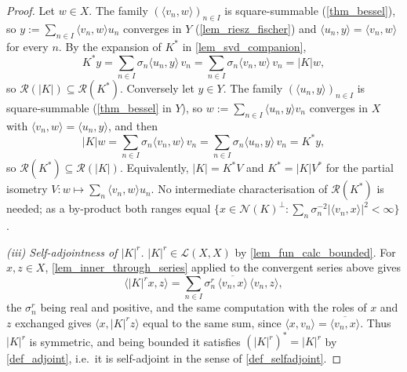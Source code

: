 \documentclass[a4paper]{report}
\theoremstyle{plain}
\theoremstyle{definition}
\theoremstyle{remark}
\begin{document}
\begin{proof}
  Let $w \in X$.  The family $(\langle v_n,w\rangle)_{n\in I}$ is square-summable
  (\cref{thm_bessel}), so $y := \sum_{n\in I}\langle v_n,w\rangle u_n$ converges in $Y$
  (\cref{lem_riesz_fischer}) and $\langle u_n,y\rangle = \langle v_n,w\rangle$ for every
  $n$.  By the expansion of $K^*$ in \cref{lem_svd_companion},
  \[
    K^*y = \sum_{n\in I}\sigma_n\langle u_n,y\rangle\,v_n
      = \sum_{n\in I}\sigma_n\langle v_n,w\rangle\,v_n = |K|w ,
  \]
  so $\mathcal{R}(|K|) \subseteq \mathcal{R}(K^*)$.  Conversely let $y \in Y$.  The family
  $(\langle u_n,y\rangle)_{n\in I}$ is square-summable (\cref{thm_bessel} in $Y$), so
  $w := \sum_{n\in I}\langle u_n,y\rangle v_n$ converges in $X$ with
  $\langle v_n,w\rangle = \langle u_n,y\rangle$, and then
  \[
    |K|w = \sum_{n\in I}\sigma_n\langle v_n,w\rangle\,v_n
      = \sum_{n\in I}\sigma_n\langle u_n,y\rangle\,v_n = K^*y ,
  \]
  so $\mathcal{R}(K^*) \subseteq \mathcal{R}(|K|)$.  Equivalently, $|K| = K^*V$ and
  $K^* = |K|V^*$ for the partial isometry $V \colon w \mapsto \sum_n\langle
  v_n,w\rangle u_n$.  No intermediate characterisation of $\mathcal{R}(K^*)$ is needed;
  as a by-product both ranges equal
  $\{x \in \mathcal{N}(K)^\perp : \sum_n\sigma_n^{-2}|\langle v_n,x\rangle|^2 < \infty\}$.

  \emph{(iii) Self-adjointness of $|K|^r$.}  $|K|^r \in \mathcal{L}(X,X)$ by
  \cref{lem_fun_calc_bounded}.  For $x,z \in X$, \cref{lem_inner_through_series} applied to
  the convergent series above gives
  \[
    \langle |K|^rx, z\rangle
      = \sum_{n\in I}\sigma_n^r\,\overline{\langle v_n,x\rangle}\,\langle v_n,z\rangle ,
  \]
  the $\sigma_n^r$ being real and positive, and the same computation with the roles of $x$
  and $z$ exchanged gives $\langle x, |K|^rz\rangle$ equal to the same sum, since
  $\langle x,v_n\rangle = \overline{\langle v_n,x\rangle}$.  Thus $|K|^r$ is symmetric, and
  being bounded it satisfies $(|K|^r)^* = |K|^r$ by \cref{def_adjoint}, i.e.\ it is
  self-adjoint in the sense of \cref{def_selfadjoint}.
\end{proof}
\end{document}
